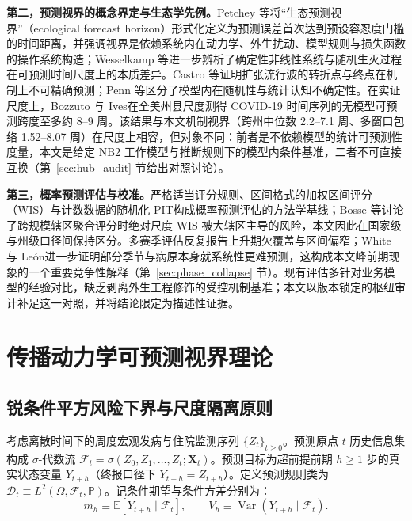 \documentclass[10pt,UTF8,a4paper,zihao=-4]{ctexart}
\theoremstyle{plain}
\theoremstyle{definition}
\theoremstyle{remark}
\begin{document}
\textbf{第二，预测视界的概念界定与生态学先例。}Petchey 等\citep{petchey2015ecological}将“生态预测视界”（ecological forecast horizon）形式化定义为预测误差首次达到预设容忍度门槛的时间距离，并强调视界是依赖系统内在动力学、外生扰动、模型规则与损失函数的操作系统构造；Wesselkamp 等\citep{wesselkamp2025forecast}进一步辨析了确定性非线性系统与随机生灭过程在可预测时间尺度上的本质差异。Castro 等\citep{castro2020turning}证明扩张流行波的转折点与终点在机制上不可精确预测；Penn 等\citep{penn2023intrinsic}区分了模型内在随机性与统计认知不确定性。在实证尺度上，Bozzuto 与 Ives\citep{bozzuto2023differences}在全美州县尺度测得 COVID-19 时间序列的无模型可预测跨度至多约 8--9 周。该结果与本文机制视界（跨州中位数 2.2--7.1 周、多窗口包络 1.52--8.07 周）在尺度上相容，但对象不同：前者是不依赖模型的统计可预测性度量，本文是给定 NB2 工作模型与推断规则下的模型内条件基准，二者不可直接互换（第~\ref{sec:hub_audit} 节给出对照讨论）。

\textbf{第三，概率预测评估与校准。}严格适当评分规则\citep{gneiting2007strictly}、区间格式的加权区间评分（WIS）\citep{bracher2021evaluating}与计数数据的随机化 PIT\citep{czado2009predictive}构成概率预测评估的方法学基线；Bosse 等\citep{bosse2023scoring}讨论了跨规模辖区聚合评分时绝对尺度 WIS 被大辖区主导的风险，本文因此在国家级与州级口径间保持区分。多赛季评估反复报告上升期欠覆盖与区间偏窄\citep{mcgowan2019collaborative, flusight2024evaluation, cramer2022evaluation}；White 与 Le\'on\citep{white2026forecastability}进一步证明部分季节与病原本身就系统性更难预测，这构成本文峰前期现象的一个重要竞争性解释（第~\ref{sec:phase_collapse} 节）。现有评估多针对业务模型的经验对比，缺乏剥离外生工程修饰的受控机制基准；本文以版本锁定的枢纽审计补足这一对照，并将结论限定为描述性证据。

\section{传播动力学可预测视界理论}\label{sec:theory}

\subsection{锐条件平方风险下界与尺度隔离原则}\label{sec:risk_floor}

考虑离散时间下的周度宏观发病与住院监测序列 $\{Z_t\}_{t \ge 0}$。预测原点 $t$ 历史信息集构成 $\sigma$-代数流 $\mathcal{F}_t = \sigma(Z_0, Z_1, \dots, Z_t; \mathbf{X}_t)$。预测目标为超前提前期 $h \ge 1$ 步的真实状态变量 $Y_{t+h}$（终报口径下 $Y_{t+h} = Z_{t+h}$）。定义预测规则类为 $\mathcal{D}_t \equiv L^2(\Omega, \mathcal{F}_t, \mathbb{P})$。记条件期望与条件方差分别为：
\begin{equation}
m_h \equiv \mathbb{E}[Y_{t+h} \mid \mathcal{F}_t], \qquad V_h \equiv \operatorname{Var}(Y_{t+h} \mid \mathcal{F}_t).
\end{equation}
\end{document}
